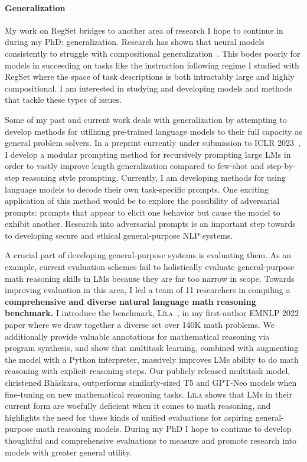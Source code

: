 \documentclass[11pt]{article}
\newcommand\lila{\textsc{L\={\i}la}\xspace}
\begin{document}
\paragraph{Generalization}

My work on RegSet bridges to another area of research I hope to continue in during my PhD: generalization.
Research has shown that neural models consistently to struggle with
compositional generalization~\cite{Lake2018GeneralizationWS}. 
This bodes poorly for models in succeeding on tasks 
like the instruction following regime I studied with RegSet 
where the space of task descriptions is both intractably large 
and highly compositional.
I am interested in studying and developing models and methods
that tackle these types of issues.

Some of my past and current work deals with generalization 
by attempting to develop methods for utilizing pre-trained language models
to their full capacity as general problem solvers.
In a preprint currently under submission to ICLR 2023~\cite{Khot2022DecomposedPA},
I develop a modular prompting method for recursively prompting large LMs 
in order to vastly improve length generalization 
compared to few-shot and step-by-step reasoning style prompting.
Currently, I am developing methods for using language models 
to decode their own task-specific prompts.
One exciting application of this method would be to explore 
the possibility of adversarial prompts: 
prompts that appear to elicit one behavior 
but cause the model to exhibit another.
Research into adversarial prompts 
is an important step towards to developing 
secure and ethical general-purpose NLP systems. 

A crucial part of developing general-purpose systems is evaluating them.
As an example, 
current evaluation schemes fail to holistically evaluate 
general-purpose math reasoning skills in LMs
because they are far too narrow in scope.
Towards improving evaluation in this area, 
I led a team of 11 researchers in compiling a
\textbf{comprehensive and diverse natural language math reasoning benchmark.} 
I introduce the benchmark, \lila~\cite{Mishra2022Lila}, 
in my first-author EMNLP 2022 paper
where we draw together a diverse set over 140K math problems.
We additionally provide valuable annotations for mathematical reasoning via program synthesis, 
and show that multitask learning, 
combined with augmenting the model with a Python interpreter,
massively improves LMs ability to do math reasoning 
with explicit reasoning steps.
Our publicly released multitask model, christened Bh\=askara, 
outperforms similarly-sized T5 and GPT-Neo models
when fine-tuning on new mathematical reasoning tasks.
\lila shows that LMs 
in their current form 
are woefully deficient when it comes to math reasoning,
and highlights the need for these kinds of unified evaluations for 
aspiring general-purpose math reasoning models.
During my PhD I hope to continue to develop thoughtful and comprehensive evaluations 
to measure and promote research into models with greater general utility.
\end{document}
